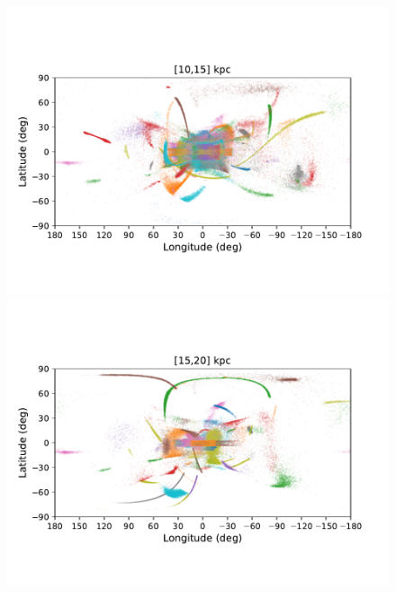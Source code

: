     \twocolumn
    \begin{figure}[h!]
        \begin{center}
            \includegraphics[clip=true, trim = 0mm 15mm 0mm 20mm, width=\columnwidth]{images/PII_ensemble_LB_D10-15_scatter.pdf}
            \includegraphics[clip=true, trim = 0mm 15mm 0mm 20mm, width=\columnwidth]{images/PII_ensemble_LB_D15-20_scatter.pdf}


\end{center}
\end{figure}
